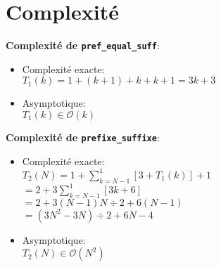 \section{Complexité}\label{complexite}

\textbf{Complexité de \texttt{pref\_equal\_suff}}:
\begin{itemize}
    \item Complexité exacte:\\
        $ T_1(k) = 1 + (k+1) + k + k + 1 = 3k + 3$\\
    \item Asymptotique:\\
        $ T_1(k) \in \mathcal{O}(k) $
\end{itemize}

\textbf{Complexité de \texttt{prefixe\_suffixe}}:
\begin{itemize}
    \item Complexité exacte:\\
        $ T_2(N) = 1 + \sum_{k=N-1}^{1} [3 + T_1(k)] + 1 $\\
        $    = 2 + 3 \sum_{k=N-1}^{1} [3k + 6]$\\
        $    = 2 + 3(N-1)N \div 2 + 6(N - 1)$\\
        $    = (3N^2 - 3N) \div 2 + 6N - 4$\\
    \item Asymptotique:\\
        $ T_2(N) \in \mathcal{O}(N^2) $
\end{itemize}

